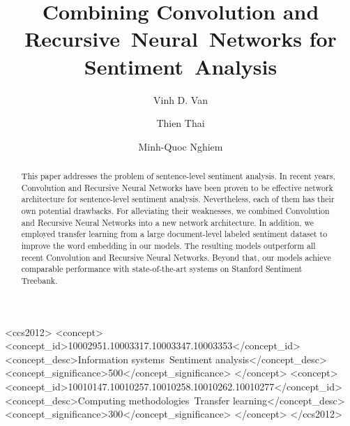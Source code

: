 \documentclass[sigconf]{acmart}
\begin{document}
\title[Combining CNN and RNN for Sentiment~Analysis]{Combining Convolution and Recursive~Neural~Networks for Sentiment~Analysis} %

\author{Vinh D. Van}

\author{Thien Thai}

\author{Minh-Quoc Nghiem}

\renewcommand{\shortauthors}{V. Van et al.}


\begin{abstract}
This paper addresses the problem of sentence-level sentiment analysis.
In recent years, Convolution and Recursive Neural Networks have been proven to be effective network architecture for sentence-level sentiment analysis.
Nevertheless, each of them has their own potential drawbacks.
For alleviating their weaknesses, we combined Convolution and Recursive Neural Networks into a new network architecture.
In addition, we employed transfer learning from a large document-level labeled sentiment dataset to improve the word embedding in our models.
The resulting models outperform all recent Convolution and Recursive Neural Networks.
Beyond that, our models achieve comparable performance with state-of-the-art systems on Stanford Sentiment Treebank.
\end{abstract}

%
%
\begin{CCSXML}
	<ccs2012>
	<concept>
	<concept_id>10002951.10003317.10003347.10003353</concept_id>
	<concept_desc>Information systems~Sentiment analysis</concept_desc>
	<concept_significance>500</concept_significance>
	</concept>
	<concept>
	<concept_id>10010147.10010257.10010258.10010262.10010277</concept_id>
	<concept_desc>Computing methodologies~Transfer learning</concept_desc>
	<concept_significance>300</concept_significance>
	</concept>
	</ccs2012>
\end{CCSXML}
\end{document}
